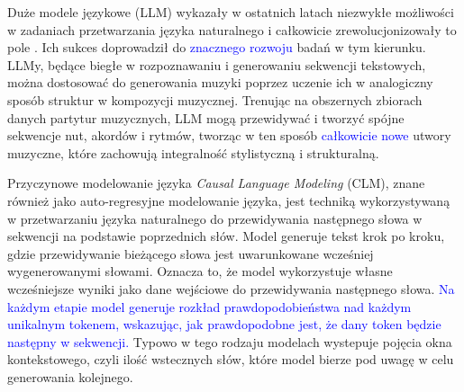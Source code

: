 \documentclass[data-science]{agh-wi} %
\begin{document}
Duże modele językowe (LLM) wykazały w ostatnich latach niezwykłe możliwości w zadaniach przetwarzania języka naturalnego i całkowicie zrewolucjonizowały to pole \cite{adiwardana2020humanlike, end_of_nlp}. Ich sukces doprowadził do \textcolor{blue}{znacznego rozwoju} badań w tym kierunku. LLMy, będące biegłe w rozpoznawaniu i generowaniu sekwencji tekstowych, można dostosować do generowania muzyki poprzez uczenie ich w analogiczny sposób struktur w kompozycji muzycznej. Trenując na obszernych zbiorach danych partytur muzycznych, LLM mogą przewidywać i tworzyć spójne sekwencje nut, akordów i rytmów, tworząc w ten sposób \textcolor{blue}{całkowicie nowe} utwory muzyczne, które zachowują integralność stylistyczną i strukturalną.

Przyczynowe modelowanie języka \textit{Causal Language Modeling} (CLM), znane również jako auto-regresyjne modelowanie języka, jest techniką wykorzystywaną w przetwarzaniu języka naturalnego do przewidywania następnego słowa w sekwencji na podstawie poprzednich słów. Model generuje tekst krok po kroku, gdzie przewidywanie bieżącego słowa jest uwarunkowane wcześniej wygenerowanymi słowami. Oznacza to, że model wykorzystuje własne wcześniejsze wyniki jako dane wejściowe do przewidywania następnego słowa. \textcolor{blue}{Na każdym etapie model generuje rozkład prawdopodobieństwa nad każdym unikalnym tokenem, wskazując, jak prawdopodobne jest, że dany token będzie następny w sekwencji.} Typowo w tego rodzaju modelach wystepuje pojęcia okna kontekstowego, czyli ilość wstecznych słów, które model bierze pod uwagę w celu generowania kolejnego.
\end{document}
